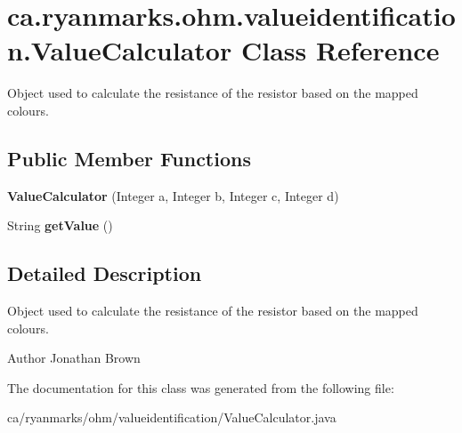 \hypertarget{classca_1_1ryanmarks_1_1ohm_1_1valueidentification_1_1_value_calculator}{}\section{ca.\+ryanmarks.\+ohm.\+valueidentification.\+Value\+Calculator Class Reference}
\label{classca_1_1ryanmarks_1_1ohm_1_1valueidentification_1_1_value_calculator}


Object used to calculate the resistance of the resistor based on the mapped colours.  


\subsection*{Public Member Functions}
\begin{DoxyCompactItemize}
\item 
\hypertarget{classca_1_1ryanmarks_1_1ohm_1_1valueidentification_1_1_value_calculator_a6221d53a82179e4f00298b47ba9af971}{}\label{classca_1_1ryanmarks_1_1ohm_1_1valueidentification_1_1_value_calculator_a6221d53a82179e4f00298b47ba9af971} 
{\bfseries Value\+Calculator} (Integer a, Integer b, Integer c, Integer d)
\item 
\hypertarget{classca_1_1ryanmarks_1_1ohm_1_1valueidentification_1_1_value_calculator_a9f276e3ead16c49bf1c291cf9facebb5}{}\label{classca_1_1ryanmarks_1_1ohm_1_1valueidentification_1_1_value_calculator_a9f276e3ead16c49bf1c291cf9facebb5} 
String {\bfseries get\+Value} ()
\end{DoxyCompactItemize}


\subsection{Detailed Description}
Object used to calculate the resistance of the resistor based on the mapped colours. 

\begin{DoxyAuthor}{Author}
Jonathan Brown 
\end{DoxyAuthor}


The documentation for this class was generated from the following file\+:\begin{DoxyCompactItemize}
\item 
ca/ryanmarks/ohm/valueidentification/Value\+Calculator.\+java\end{DoxyCompactItemize}
